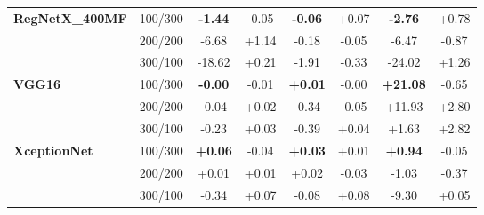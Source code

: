 \begin{table}[htbp]
\begin{tabular}{@{}ll | cc | cc | cc@{}}
\midrule
\multirow{3}{*}{\textbf{RegNetX\_400MF}} & 100/300 & \textbf{-1.44} & -0.05 & \textbf{-0.06} & +0.07 & \textbf{-2.76} & +0.78 \\
 & 200/200 & -6.68 & +1.14 & -0.18 & -0.05 & -6.47 & -0.87 \\
 & 300/100 & -18.62 & +0.21 & -1.91 & -0.33 & -24.02 & +1.26 \\
\midrule
\multirow{3}{*}{\textbf{VGG16}} & 100/300 & \textbf{-0.00} & -0.01 & \textbf{+0.01} & -0.00 & \textbf{+21.08} & -0.65 \\
 & 200/200 & -0.04 & +0.02 & -0.34 & -0.05 & +11.93 & +2.80 \\
 & 300/100 & -0.23 & +0.03 & -0.39 & +0.04 & +1.63 & +2.82 \\
\midrule
\multirow{3}{*}{\textbf{XceptionNet}} & 100/300 & \textbf{+0.06} & -0.04 & \textbf{+0.03} & +0.01 & \textbf{+0.94} & -0.05 \\
 & 200/200 & +0.01 & +0.01 & +0.02 & -0.03 & -1.03 & -0.37 \\
 & 300/100 & -0.34 & +0.07 & -0.08 & +0.08 & -9.30 & +0.05 \\
\bottomrule
\end{tabular}
\end{table}